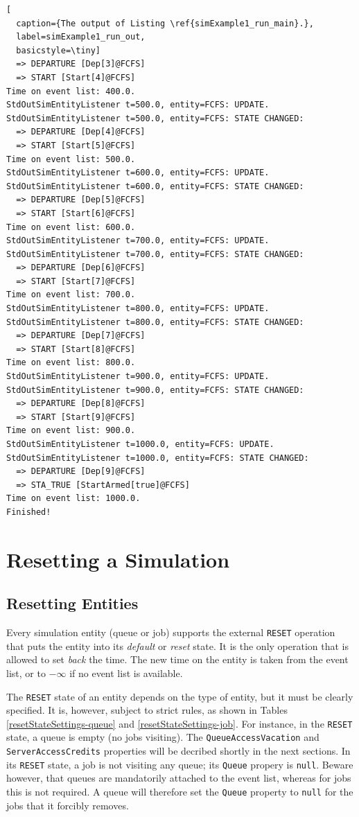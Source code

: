 \documentclass[12pt]{book}
\begin{document}
\begin{lstfloat}
\begin{lstlisting}[
  caption={The output of Listing \ref{simExample1_run_main}.},
  label=simExample1_run_out,
  basicstyle=\tiny]
  => DEPARTURE [Dep[3]@FCFS]
  => START [Start[4]@FCFS]
Time on event list: 400.0.
StdOutSimEntityListener t=500.0, entity=FCFS: UPDATE.
StdOutSimEntityListener t=500.0, entity=FCFS: STATE CHANGED:
  => DEPARTURE [Dep[4]@FCFS]
  => START [Start[5]@FCFS]
Time on event list: 500.0.
StdOutSimEntityListener t=600.0, entity=FCFS: UPDATE.
StdOutSimEntityListener t=600.0, entity=FCFS: STATE CHANGED:
  => DEPARTURE [Dep[5]@FCFS]
  => START [Start[6]@FCFS]
Time on event list: 600.0.
StdOutSimEntityListener t=700.0, entity=FCFS: UPDATE.
StdOutSimEntityListener t=700.0, entity=FCFS: STATE CHANGED:
  => DEPARTURE [Dep[6]@FCFS]
  => START [Start[7]@FCFS]
Time on event list: 700.0.
StdOutSimEntityListener t=800.0, entity=FCFS: UPDATE.
StdOutSimEntityListener t=800.0, entity=FCFS: STATE CHANGED:
  => DEPARTURE [Dep[7]@FCFS]
  => START [Start[8]@FCFS]
Time on event list: 800.0.
StdOutSimEntityListener t=900.0, entity=FCFS: UPDATE.
StdOutSimEntityListener t=900.0, entity=FCFS: STATE CHANGED:
  => DEPARTURE [Dep[8]@FCFS]
  => START [Start[9]@FCFS]
Time on event list: 900.0.
StdOutSimEntityListener t=1000.0, entity=FCFS: UPDATE.
StdOutSimEntityListener t=1000.0, entity=FCFS: STATE CHANGED:
  => DEPARTURE [Dep[9]@FCFS]
  => STA_TRUE [StartArmed[true]@FCFS]
Time on event list: 1000.0.
Finished!

\end{lstlisting}
\end{lstfloat}

\section{Resetting a Simulation}
\label{sec:guided:reset}

\subsection{Resetting Entities}

Every simulation entity (queue or job) supports the
  external \lstinline-RESET- operation
  that puts the entity into its {\em default\/} or
  {\em reset\/} state.
It is the only operation that is allowed to
  set {\em back\/} the time.
The new time on the entity is taken from the event list,
  or to $-\infty$ if no event list is available.

The \lstinline-RESET- state of an entity depends
  on the type of entity,
  but it must be clearly specified.
It is, however, subject to strict rules,
  as shown in Tables
  \ref{resetStateSettings-queue}
  and
  \ref{resetStateSettings-job}.
For instance,
  in the \lstinline|RESET| state,
  a queue is empty (no jobs visiting).
The \lstinline|QueueAccessVacation| and
  \lstinline|ServerAccessCredits|
  properties will be decribed shortly
  in the next sections.
In its \lstinline|RESET| state,
  a job is not visiting any queue;
  its \lstinline|Queue| propery is \lstinline|null|.
Beware however,
  that queues are mandatorily attached to the event list,
  whereas for jobs this is not required.
A queue will therefore set
  the \lstinline|Queue| property to \lstinline|null|
  for the jobs that it forcibly removes.
\end{document}
